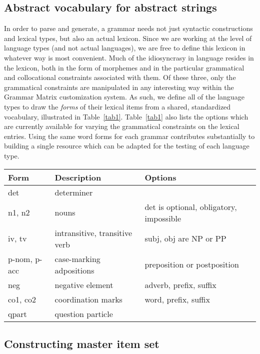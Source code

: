 \documentclass[11pt]{article}
\begin{document}
\subsection{Abstract vocabulary for abstract strings}

In order to parse and generate, a grammar needs not just syntactic
constructions and lexical types, but also an actual lexicon.  Since we
are working at the level of language types (and not actual languages),
we are free to define this lexicon in whatever way is most convenient.
Much of the idiosyncrasy in language resides in the lexicon, both in
the form of morphemes and in the particular grammatical and
collocational constraints associated with them.  Of these three, only
the grammatical constraints are manipulated in any interesting way
within the Grammar Matrix customization system.  As such, we define
all of the language types to draw the {\it forms} of their lexical
items from a shared, standardized vocabulary, illustrated in
Table~\ref{tab1}.  Table~\ref{tab1} also lists the options which are
currently available for varying the grammatical constraints on the
lexical entries.  Using the same word forms for each grammar
contributes substantially to building a single resource which can be
adapted for the testing of each language type.

\begin{table*}[ht]
\begin{center}
\begin{tabular}{|l|l|l|}
\hline
Form & Description & Options \\ \hline \hline
det & determiner & \\ 
n1, n2 & nouns & det is optional, obligatory, impossible\\
iv, tv & intransitive, transitive verb & subj, obj are NP or PP\\
p-nom, p-acc & case-marking adpositions & preposition or postposition\\
neg & negative element & adverb, prefix, suffix\\
co1, co2 & coordination marks & word, prefix, suffix\\
qpart & question particle & \\
\hline
\end{tabular}
\end{center}
\caption{Standardized lexicon}
\label{tab1}
\end{table*}


\subsection{Constructing master item set}
\end{document}
